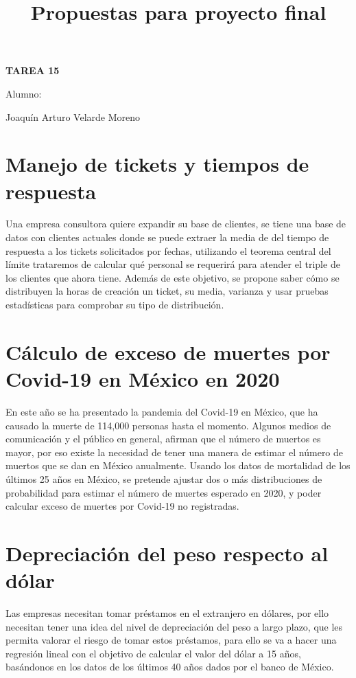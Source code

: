 \documentclass[12pt]{article}
\title{Propuestas para proyecto final}
\date{}
\begin{document}
	\maketitle
	\begin{center}


\centerline{\textbf{TAREA 15} } 
\textbf{ }

\centerline{Alumno: } 
\centerline{Joaquín Arturo Velarde Moreno}


	\end{center}
	

\section{Manejo de tickets y tiempos de respuesta}
Una empresa consultora quiere expandir su base de clientes, se tiene una base de datos con clientes actuales donde se puede extraer la media de del tiempo de respuesta a los tickets solicitados por fechas, utilizando el teorema central del límite trataremos de calcular qué personal se requerirá para atender el triple de los clientes que ahora tiene.
Además de este objetivo, se propone saber cómo se distribuyen la horas de creación un ticket, su media, varianza y usar pruebas estadísticas para comprobar su tipo de distribución.

\section{Cálculo de exceso de muertes por Covid-19 en México en 2020}
En este año se ha presentado la pandemia del Covid-19 en México, que ha causado la muerte de 114,000 personas hasta el momento. Algunos medios de comunicación y el público en general, afirman que el número de muertos es mayor, por eso existe la necesidad de tener una manera de estimar el número de muertos que se dan en México anualmente.
Usando los datos de mortalidad de los últimos 25 años en México, se pretende ajustar dos o más distribuciones de probabilidad para estimar el número de muertes esperado en 2020, y poder calcular exceso de muertes por Covid-19 no registradas.

\section{Depreciación del peso respecto al dólar}
Las empresas necesitan tomar préstamos en el extranjero en dólares, por ello necesitan tener una idea del nivel de depreciación del peso a largo plazo, que les permita valorar el riesgo de tomar estos préstamos, para ello se va a hacer una regresión lineal con el objetivo de calcular el valor del dólar a 15 años, basándonos en los datos de los últimos 40 años dados por el banco de México.

\printbibliography[title={Referencias}]
\end{document}
